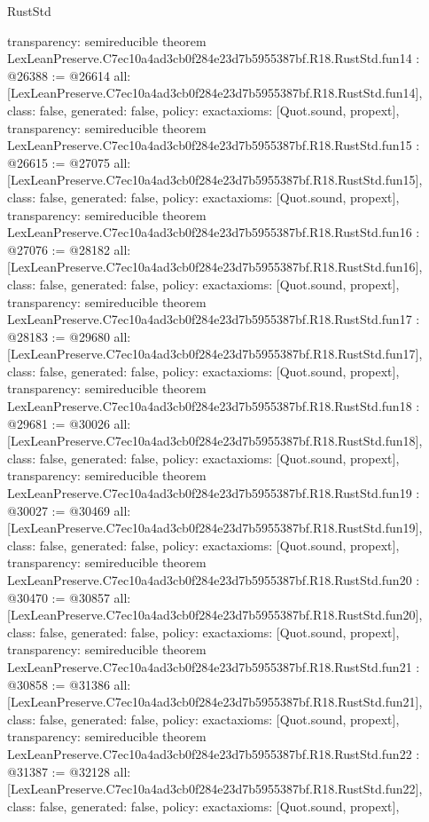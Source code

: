\begin{lexlean}{RustStd}
\begin{coremodule}
{  transparency: semireducible
}
theorem LexLeanPreserve.C7ec10a4ad3cb0f284e23d7b5955387bf.R18.RustStd.fun14 : @26388 := @26614 {
  all: [LexLeanPreserve.C7ec10a4ad3cb0f284e23d7b5955387bf.R18.RustStd.fun14],
  class: false,
  generated: false,
  policy: exact{axioms: [Quot.sound, propext]},
  transparency: semireducible
}
theorem LexLeanPreserve.C7ec10a4ad3cb0f284e23d7b5955387bf.R18.RustStd.fun15 : @26615 := @27075 {
  all: [LexLeanPreserve.C7ec10a4ad3cb0f284e23d7b5955387bf.R18.RustStd.fun15],
  class: false,
  generated: false,
  policy: exact{axioms: [Quot.sound, propext]},
  transparency: semireducible
}
theorem LexLeanPreserve.C7ec10a4ad3cb0f284e23d7b5955387bf.R18.RustStd.fun16 : @27076 := @28182 {
  all: [LexLeanPreserve.C7ec10a4ad3cb0f284e23d7b5955387bf.R18.RustStd.fun16],
  class: false,
  generated: false,
  policy: exact{axioms: [Quot.sound, propext]},
  transparency: semireducible
}
theorem LexLeanPreserve.C7ec10a4ad3cb0f284e23d7b5955387bf.R18.RustStd.fun17 : @28183 := @29680 {
  all: [LexLeanPreserve.C7ec10a4ad3cb0f284e23d7b5955387bf.R18.RustStd.fun17],
  class: false,
  generated: false,
  policy: exact{axioms: [Quot.sound, propext]},
  transparency: semireducible
}
theorem LexLeanPreserve.C7ec10a4ad3cb0f284e23d7b5955387bf.R18.RustStd.fun18 : @29681 := @30026 {
  all: [LexLeanPreserve.C7ec10a4ad3cb0f284e23d7b5955387bf.R18.RustStd.fun18],
  class: false,
  generated: false,
  policy: exact{axioms: [Quot.sound, propext]},
  transparency: semireducible
}
theorem LexLeanPreserve.C7ec10a4ad3cb0f284e23d7b5955387bf.R18.RustStd.fun19 : @30027 := @30469 {
  all: [LexLeanPreserve.C7ec10a4ad3cb0f284e23d7b5955387bf.R18.RustStd.fun19],
  class: false,
  generated: false,
  policy: exact{axioms: [Quot.sound, propext]},
  transparency: semireducible
}
theorem LexLeanPreserve.C7ec10a4ad3cb0f284e23d7b5955387bf.R18.RustStd.fun20 : @30470 := @30857 {
  all: [LexLeanPreserve.C7ec10a4ad3cb0f284e23d7b5955387bf.R18.RustStd.fun20],
  class: false,
  generated: false,
  policy: exact{axioms: [Quot.sound, propext]},
  transparency: semireducible
}
theorem LexLeanPreserve.C7ec10a4ad3cb0f284e23d7b5955387bf.R18.RustStd.fun21 : @30858 := @31386 {
  all: [LexLeanPreserve.C7ec10a4ad3cb0f284e23d7b5955387bf.R18.RustStd.fun21],
  class: false,
  generated: false,
  policy: exact{axioms: [Quot.sound, propext]},
  transparency: semireducible
}
theorem LexLeanPreserve.C7ec10a4ad3cb0f284e23d7b5955387bf.R18.RustStd.fun22 : @31387 := @32128 {
  all: [LexLeanPreserve.C7ec10a4ad3cb0f284e23d7b5955387bf.R18.RustStd.fun22],
  class: false,
  generated: false,
  policy: exact{axioms: [Quot.sound, propext]},
}
\end{coremodule}
\end{lexlean}
